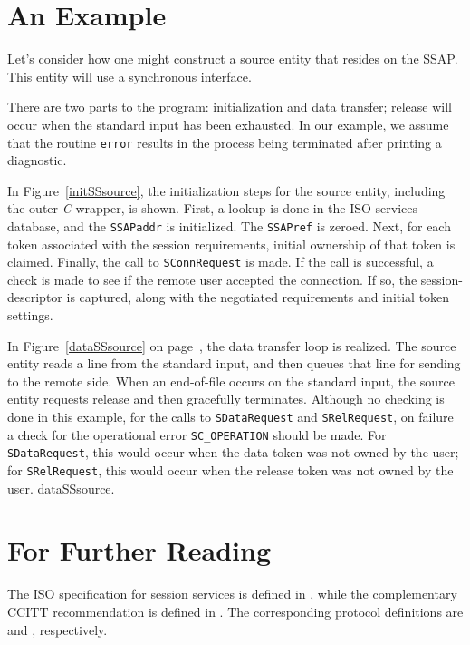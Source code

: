 \section	{An Example}
Let's consider how one might construct a source entity that resides on the
SSAP.
This entity will use a synchronous interface.

There are two parts to the program:
initialization and data transfer;
release will occur when the standard input has been exhausted.
In our example,
we assume that the routine \verb"error" results in the process being
terminated after printing a diagnostic.

In Figure~\ref{initSSsource},
the initialization steps for the source entity,
including the outer {\em C\/} wrapper,
is shown.
First, a lookup is done in the ISO services database,
and the \verb"SSAPaddr" is initialized.
The \verb"SSAPref" is zeroed.
Next, for each token associated with the session requirements,
initial ownership of that token is claimed.
Finally,
the call to \verb"SConnRequest" is made.
If the call is successful,
a check is made to see if the remote user accepted the connection.
If so,
the session-descriptor is captured,
along with the negotiated requirements and initial token settings.

In Figure~\ref{dataSSsource} on page~\pageref{dataSSsource},
the data transfer loop is realized.
The source entity reads a line from the standard input,
and then queues that line for sending to the remote side.
When an end-of-file occurs on the standard input,
the source entity requests release and then gracefully terminates.
Although no checking is done in this example,
for the calls to \verb"SDataRequest" and \verb"SRelRequest",
on failure
a check for the operational error \verb"SC_OPERATION" should be made.
For \verb"SDataRequest",
this would occur when the data token was not owned by the user;
for \verb"SRelRequest",
this would occur when the release token was not owned by the user.
\clearpage
{}
\clearpage
{}\empty
\clearpage
{}%
	{dataSSsource}.

\section	{For Further Reading}
The ISO specification for session services is defined in
\cite{ISO.SP.Service},
while the complementary CCITT recommendation is defined in
\cite{CCITT.SP.Service}.
The corresponding protocol definitions are \cite{ISO.SP.Protocol} and
\cite{CCITT.SP.Protocol}, respectively.



